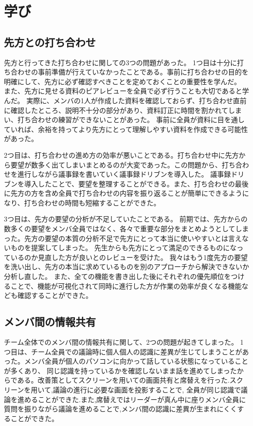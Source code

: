 \section{学び}
\subsection{先方との打ち合わせ}
先方と行ってきた打ち合わせに関しての3つの問題があった。
1つ目は十分に打ち合わせの事前準備が行えていなかったことである。事前に打ち合わせの目的を明確にして、先方に必ず確認すべきことを定めておくことの重要性を学んだ。
また、先方に見せる資料のピアレビューを全員で必ず行うことも大切であると学んだ。
実際に、メンバの1人が作成した資料を確認しておらず、打ち合わせ直前に確認したところ、説明不十分の部分があり、資料訂正に時間を割かれてしまい、打ち合わせの練習ができないことがあった。
事前に全員が資料に目を通していれば、余裕を持ってより先方にとって理解しやすい資料を作成できる可能性があった。

2つ目は、打ち合わせの進め方の効率が悪いことである。打ち合わせ中に先方から要望が数多く出てしまいまとめるのが大変であった。この問題から、打ち合わせを進行しながら議事録を書いていく議事録ドリブンを導入した。
議事録ドリブンを導入したことで、要望を整理することができる。また、打ち合わせの最後に先方の方を含め全員で打ち合わせの内容を振り返ることが簡単にできるようになり、打ち合わせの時間も短縮することができた。

3つ目は、先方の要望の分析が不足していたことである。
前期では、先方からの数多くの要望をメンバ全員ではなく、各々で重要な部分をまとめようとしてしまった。先方の要望の本質の分析不足で先方にとって本当に使いやすいとは言えないものを提案してしまった。
先生からも先方にとって満足のできるものになっているのか見直した方が良いとのレビューを受けた。
我々はもう1度先方の要望を洗い出し、先方の本当に求めているものを別のアプローチから解決できないか分析し直した。
また、全ての機能を書き出した後にそれぞれの優先順位をつけることで、機能が可視化されて同時に進行した方が作業の効率が良くなる機能なども確認することができた。

\subsection{メンバ間の情報共有}
チーム全体でのメンバ間の情報共有に関して、2つの問題が起きてしまった。
1つ目は、チーム全員での議論時に個人個人の認識に差異が生じてしまうことがあった。メンバ全員が個人のパソコンに向かって話している状態になっていることが多くあり、
同じ認識を持っているかを確認しないまま話を進めてしまったからである。改善策としてスクリーンを用いての画面共有と席替えを行った.スクリーンを用いて,議論の進行に必要な画面を投影することで,
全員が同じ認識で議論を進めることができた.また,席替えではリーダーが真ん中に座りメンバ全員に質問を振りながら議論を進めることで,メンバ間の認識に差異が生まれにくくすることができた。

